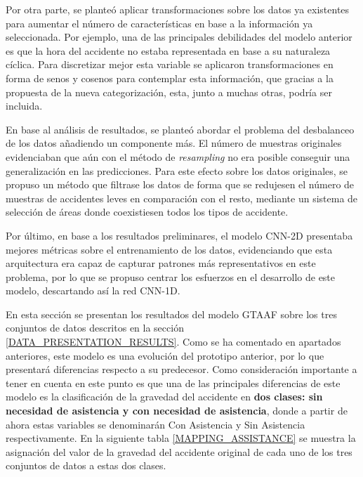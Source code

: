 Por otra parte, se planteó aplicar transformaciones sobre los datos ya existentes para aumentar el número de características en base a la información ya seleccionada. Por ejemplo, una de las principales debilidades del modelo anterior es que la hora del accidente no estaba representada en base a su naturaleza cíclica. Para discretizar mejor esta variable se aplicaron transformaciones en forma de senos y cosenos para contemplar esta información, que gracias a la propuesta de la nueva categorización, esta, junto a muchas otras, podría ser incluida.

En base al análisis de resultados, se planteó abordar el problema del desbalanceo de los datos añadiendo un componente más. El número de muestras originales evidenciaban que aún con el método de \textit{resampling} no era posible conseguir una generalización en las predicciones. Para este efecto sobre los datos originales, se propuso un método que filtrase los datos de forma que se redujesen el número de muestras de accidentes leves en comparación con el resto, mediante un sistema de selección de áreas donde coexistiesen todos los tipos de accidente.

Por último, en base a los resultados preliminares, el modelo CNN-2D presentaba mejores métricas sobre el entrenamiento de los datos, evidenciando que esta arquitectura era capaz de capturar patrones más representativos en este problema, por lo que se propuso centrar los esfuerzos en el desarrollo de este modelo, descartando así la red CNN-1D. 


En esta sección se presentan los resultados del modelo GTAAF sobre los tres conjuntos de datos descritos en la sección \ref{DATA_PRESENTATION_RESULTS}. Como se ha comentado en apartados anteriores, este modelo es una evolución del prototipo anterior, por lo que presentará diferencias respecto a su predecesor.  Como consideración importante a tener en cuenta en este punto es que una de las principales diferencias de este modelo es la clasificación de la gravedad del accidente en \textbf{dos clases: sin necesidad de asistencia y con necesidad de asistencia}, donde a partir de ahora estas variables se denominarán Con Asistencia y Sin Asistencia respectivamente. En la siguiente tabla \ref{MAPPING_ASSISTANCE} se muestra la asignación del valor de la gravedad del accidente original de cada uno de los tres conjuntos de datos a estas dos clases.


